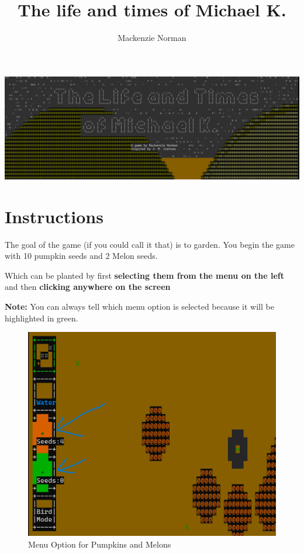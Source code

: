 \documentclass{article}
\title{The life and times of Michael K.}
\author{Mackenzie Norman}
\begin{document}
\maketitle
\begin{center}
    \includegraphics[width=\textwidth]{title_screen.png}
\end{center}
\section*{Instructions}
The goal of the game (if you could call it that) is to garden. You begin the game with 10 pumpkin seeds and 2 Melon seeds.

Which can be planted by first \textbf{selecting them from the menu on the left} and then \textbf{clicking anywhere on the screen}

\textbf{Note:} You can always tell which menu option is selected because it will be highlighted in green.

    \begin{figure}[H]
    \includegraphics[width=\textwidth]{melons-pumpkins.png}
    \caption{Menu Option for Pumpkins and Melons}
        
    \end{figure}
\end{document}
